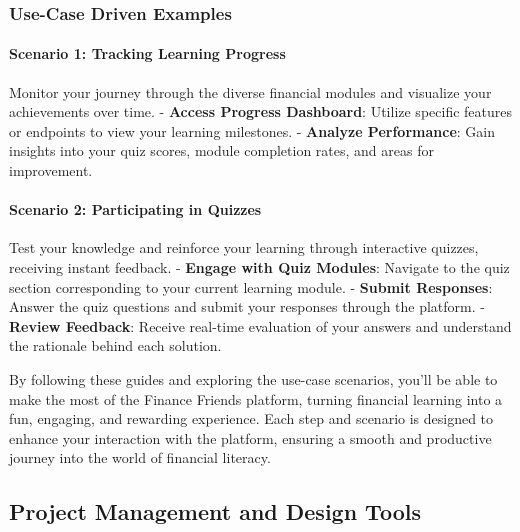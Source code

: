 \hypertarget{use-case-driven-examples}{%
\subsubsection{Use-Case Driven
Examples}\label{use-case-driven-examples}}

\hypertarget{scenario-1-tracking-learning-progress}{%
\paragraph{Scenario 1: Tracking Learning
Progress}\label{scenario-1-tracking-learning-progress}}

Monitor your journey through the diverse financial modules and visualize
your achievements over time. - \textbf{Access Progress Dashboard}:
Utilize specific features or endpoints to view your learning milestones.
- \textbf{Analyze Performance}: Gain insights into your quiz scores,
module completion rates, and areas for improvement.

\hypertarget{scenario-2-participating-in-quizzes}{%
\paragraph{Scenario 2: Participating in
Quizzes}\label{scenario-2-participating-in-quizzes}}

Test your knowledge and reinforce your learning through interactive
quizzes, receiving instant feedback. - \textbf{Engage with Quiz
Modules}: Navigate to the quiz section corresponding to your current
learning module. - \textbf{Submit Responses}: Answer the quiz questions
and submit your responses through the platform. - \textbf{Review
Feedback}: Receive real-time evaluation of your answers and understand
the rationale behind each solution.

By following these guides and exploring the use-case scenarios, you'll
be able to make the most of the Finance Friends platform, turning
financial learning into a fun, engaging, and rewarding experience. Each
step and scenario is designed to enhance your interaction with the
platform, ensuring a smooth and productive journey into the world of
financial literacy.

\hypertarget{project-management-and-design-tools}{%
\subsection{Project Management and Design
Tools}\label{project-management-and-design-tools}}

